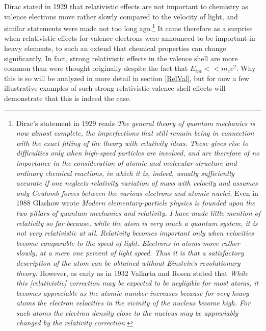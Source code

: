 \documentclass[12pt]{article}
\begin{document}
Dirac stated in 1929\cite{Dirac-1929} that relativistic effects are not important to chemistry as valence electrons move rather slowly compared to the velocity of light, and similar statements were made not too long ago.\footnote{Dirac's statement in 1929 reads\cite{Dirac-1929} {\it The general theory of quantum mechanics is now almost complete, the imperfections that still remain being in connection with the exact fitting of the theory with relativity ideas. These gives rise to difficulties only when high-speed particles are involved, and are therefore of no importance in the consideration of atomic and molecular structure and ordinary chemical reactions, in which it is, indeed, usually sufficiently accurate if one neglects relativity variation of mass with velocity and assumes only Coulomb forces between the various electrons and atomic nuclei.} Even in 1988 Glashow wrote\cite{glashow-1993} {\it Modern elementary-particle physics is founded upon the two pillars of quantum mechanics and relativity. I have made little mention of relativity so far because, while the atom is very much a quantum system, it is not very relativistic at all. Relativity becomes important only when velocities become comparable to the speed of light. Electrons in atoms move rather slowly, at a mere one percent of light speed. Thus it is that a satisfactory description of the atom can be obtained without Einstein's revolutionary theory.} However, as early as in 1932 Vallarta and Rosen stated that\cite{Vallarta-1932} {\it While this [relativistic] correction may be expected to be negligible for most atoms, it becomes appreciable as the atomic number increases because for very heavy atoms the electron velocities in the vicinity of the nucleus become high. For such atoms the electron density close to the nucleus may be appreciably changed by the relativity correction.}} 
It came therefore as a surprise when relativistic effects for valence electrons were announced to be important in heavy elements, to such an extend that chemical properties can change significantly.\cite{Desclaux-1973,Pyykko-1976, Pyykko-1976a, Pyykko-1977a,Pyykko-1977b,Pyykko-1979,Pitzer-1979,Pyykko-1988} 
In fact, strong relativistic effects in the valence shell are more common than were thought originally\cite{pyykko-2012relativistic} despite the fact that $E_{int}<<m_ec^2$. Why this is so will be analyzed in more detail in section \ref{RelVal}, but for now a few illustrative examples of such strong relativistic valence shell effects will demonstrate that this is indeed the case.
\end{document}
